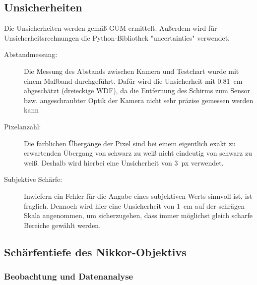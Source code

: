 \documentclass[
	a4paper,
	12pt,
	pagesize,
	ngerman
]{scrartcl}
\begin{document}
	\subsection{Unsicherheiten} %
Die Unsicherheiten werden gemäß GUM ermittelt. 
	Außerdem wird für Unsicherheitsrechnungen die Python-Bibliothek "uncertainties" verwendet.
	\begin{description}
		\item[Abstandmessung:] Die Messung des Abstands zwischen Kamera und Testchart wurde mit einem Maßband durchgeführt. 
			Dafür wird die Unsicherheit mit \SI{0,81}{cm} abgeschätzt (dreieckige WDF), da die Entfernung des Schirms zum Sensor bzw. angeschraubter Optik der Kamera nicht sehr präzise gemessen werden kann
		\item[Pixelanzahl:] Die farblichen Übergänge der Pixel sind bei einem eigentlich exakt zu erwartenden Übergang von schwarz zu weiß nicht eindeutig von schwarz zu weiß. %
			Deshalb wird hierbei eine Unsicherheit von \SI{3}{px} verwendet.
		\item[Subjektive Schärfe:] Inwiefern ein Fehler für die Angabe eines subjektiven Werts sinnvoll ist, ist fraglich. %
			Dennoch wird hier eine Unsicherheit von \SI{1}{cm} auf der schrägen Skala angenommen, um sicherzugehen, dass immer möglichst gleich scharfe Bereiche gewählt werden. 
	\end{description} %

	\subsection{Schärfentiefe des Nikkor-Objektivs}
	\subsubsection{Beobachtung und Datenanalyse}
\end{document}
